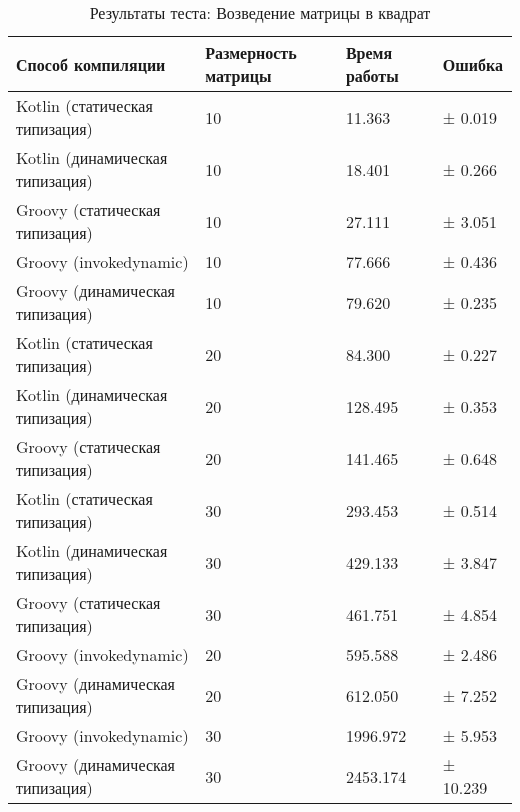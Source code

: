     
    
    \begin{table}[h]
\caption{\label{tab:matrixSquareBenchResults}Результаты теста: Возведение матрицы в квадрат}
\begin{center}
\begin{tabular}{|l|p{}|l|l|}
\hline
Способ компиляции & Размерность матрицы	& Время работы & Ошибка \\
\hline
Kotlin (статическая типизация)            & 10 &   11.363 & ±  0.019 \\
Kotlin (динамическая типизация)           & 10 &   18.401 & ±  0.266 \\
Groovy (статическая типизация)            & 10 &   27.111 & ±  3.051 \\
Groovy (invokedynamic)                    & 10 &   77.666 & ±  0.436 \\
Groovy (динамическая типизация)           & 10 &   79.620 & ±  0.235 \\
Kotlin (статическая типизация)            & 20 &   84.300 & ±  0.227 \\
Kotlin (динамическая типизация)           & 20 &  128.495 & ±  0.353 \\
Groovy (статическая типизация)            & 20 &  141.465 & ±  0.648 \\
Kotlin (статическая типизация)            & 30 &  293.453 & ±  0.514 \\
Kotlin (динамическая типизация)           & 30 &  429.133 & ±  3.847 \\
Groovy (статическая типизация)            & 30 &  461.751 & ±  4.854 \\
Groovy (invokedynamic)                    & 20 &  595.588 & ±  2.486 \\
Groovy (динамическая типизация)           & 20 &  612.050 & ±  7.252 \\
Groovy (invokedynamic)                    & 30 & 1996.972 & ±  5.953 \\
Groovy (динамическая типизация)           & 30 & 2453.174 & ± 10.239 \\
\hline
\end{tabular}
\end{center}
\end{table} 


